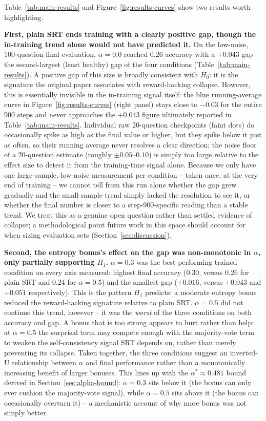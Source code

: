 \documentclass{article}
\begin{document}
Table~\ref{tab:main-results} and Figure~\ref{fig:results-curves} show two
results worth highlighting.

\textbf{First, plain SRT ends training with a clearly positive gap, though
the in-training trend alone would not have predicted it.} On the
low-noise, 100-question final evaluation, $\alpha{=}0.0$ reached $0.26$
accuracy with a $+0.043$ gap -- the second-largest (least healthy) gap of
the four conditions (Table~\ref{tab:main-results}). A positive gap of this
size is broadly consistent with \textbf{$H_0$}: it is the signature the
original paper associates with reward-hacking collapse. However, this is
essentially invisible in the in-training signal itself: the blue
running-average curve in Figure~\ref{fig:results-curves} (right panel)
stays close to $-0.03$ for the entire 900 steps and never approaches the
$+0.043$ figure ultimately reported in Table~\ref{tab:main-results}.
Individual raw 20-question checkpoints (faint dots) do occasionally spike
as high as the final value or higher, but they spike below it just as
often, so their running average never resolves a clear direction; the
noise floor of a 20-question estimate (roughly $\pm0.05$--$0.10$) is simply
too large relative to the effect size to detect it from the training-time
signal alone. Because we only have one large-sample, low-noise measurement
per condition -- taken once, at the very end of training -- we cannot tell
from this run alone whether the gap grew gradually and the small-sample
trend simply lacked the resolution to see it, or whether the final number
is closer to a step-900-specific reading than a stable trend. We treat this
as a genuine open question rather than settled evidence of collapse; a
methodological point future work in this space should account for when
sizing evaluation sets (Section~\ref{sec:discussion}).

\textbf{Second, the entropy bonus's effect on the gap was non-monotonic in
$\alpha$, only partially supporting $H_1$.} $\alpha{=}0.3$ was the
best-performing trained condition on every axis measured: highest final
accuracy ($0.30$, versus $0.26$ for plain SRT and $0.24$ for $\alpha{=}0.5$)
and the smallest gap ($+0.016$, versus $+0.043$ and $+0.051$ respectively).
This is the pattern $H_1$ predicts: a moderate entropy bonus reduced the
reward-hacking signature relative to plain SRT. $\alpha{=}0.5$ did not
continue this trend, however -- it was the \emph{worst} of the three
conditions on both accuracy and gap. A bonus that is too strong appears to
hurt rather than help: at $\alpha{=}0.5$ the surprisal term may compete
enough with the
majority-vote term to weaken the self-consistency signal SRT depends on,
rather than merely preventing its collapse. Taken together, the three
conditions suggest an inverted-U relationship between $\alpha$ and final
performance rather than a monotonically increasing benefit of larger
bonuses. This lines up with the $\alpha^{*} \approx 0.481$ bound derived in
Section~\ref{sec:alpha-bound}: $\alpha{=}0.3$ sits below it (the bonus can
only ever cushion the majority-vote signal), while $\alpha{=}0.5$ sits above
it (the bonus can occasionally overturn it) -- a mechanistic account of why
more bonus was not simply better.
\end{document}
